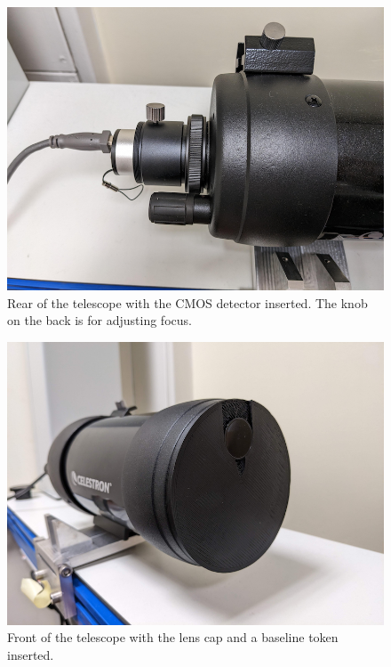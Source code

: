 \documentclass[11pt]{article}
\begin{document}
\begin{figure}[h]
    \centering
    \includegraphics[width=1\textwidth]{doc/tel.png}
    \caption{Rear of the telescope with the CMOS detector inserted. The knob on the back is for adjusting focus.}
    \label{fig:tel}
\end{figure}

\begin{figure}[h]
    \centering
    \includegraphics[width=1\textwidth]{doc/tel2.png}
    \caption{Front of the telescope with the lens cap and a baseline token inserted.}
    \label{fig:tel2}
\end{figure}
\end{document}

